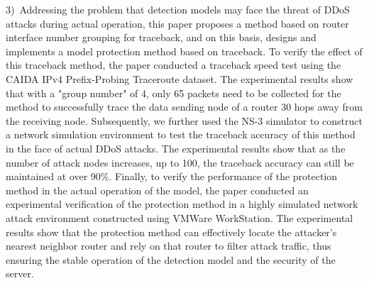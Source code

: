 \begin{eabstract}
    3)~Addressing the problem that detection models may face the threat of DDoS attacks during actual operation, this paper proposes a method based on router interface number grouping for traceback, and on this basis, designs and implements a model protection method based on traceback. To verify the effect of this traceback method, the paper conducted a traceback speed test using the CAIDA IPv4 Prefix-Probing Traceroute dataset. The experimental results show that with a "group number" of 4, only 65 packets need to be collected for the method to successfully trace the data sending node of a router 30 hops away from the receiving node. Subsequently, we further used the NS-3 simulator to construct a network simulation environment to test the traceback accuracy of this method in the face of actual DDoS attacks. The experimental results show that as the number of attack nodes increases, up to 100, the traceback accuracy can still be maintained at over 90\%. Finally, to verify the performance of the protection method in the actual operation of the model, the paper conducted an experimental verification of the protection method in a highly simulated network attack environment constructed using VMWare WorkStation. The experimental results show that the protection method can effectively locate the attacker's nearest neighbor router and rely on that router to filter attack traffic, thus ensuring the stable operation of the detection model and the security of the server.
\end{eabstract}

